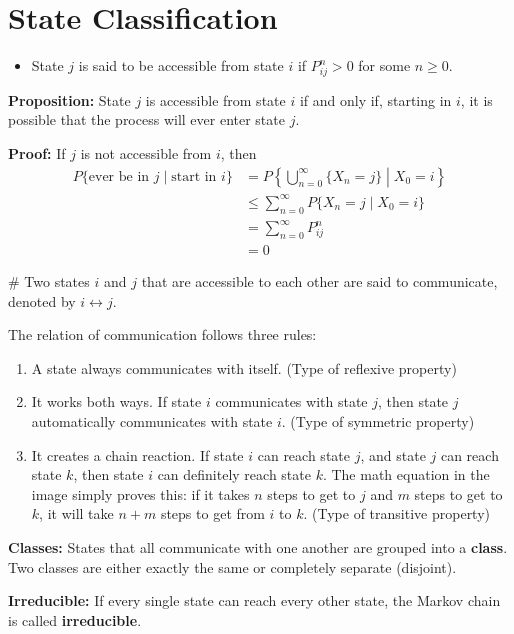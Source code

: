 \section{\textcolor{secondary}{State Classification}}

\begin{itemize}
    \item State $j$ is said to be accessible from state $i$ if $P_{ij}^n > 0$ for some $n \ge 0$.
\end{itemize}

\textbf{Proposition:} State $j$ is accessible from state $i$ if and only if, starting in $i$, it is possible that the process will ever enter state $j$.

\textbf{Proof:} If $j$ is not accessible from $i$, then
\begin{align*}
    P\{\text{ever be in } j \mid \text{start in } i\} &= P\left\{ \bigcup_{n=0}^\infty \{X_n = j\} \middle| X_0 = i \right\} \\
    &\le \sum_{n=0}^\infty P\{X_n = j \mid X_0 = i\} \\
    &= \sum_{n=0}^\infty P_{ij}^n \\
    &= 0
\end{align*}

\# Two states $i$ and $j$ that are accessible to each other are said to communicate, denoted by $i \leftrightarrow j$.

The relation of communication follows three rules:
\begin{enumerate}
    \item A state always communicates with itself. (Type of reflexive property)
    \item It works both ways. If state $i$ communicates with state $j$, then state $j$ automatically communicates with state $i$. (Type of symmetric property)
    \item It creates a chain reaction. If state $i$ can reach state $j$, and state $j$ can reach state $k$, then state $i$ can definitely reach state $k$. The math equation in the image simply proves this: if it takes $n$ steps to get to $j$ and $m$ steps to get to $k$, it will take $n+m$ steps to get from $i$ to $k$. (Type of transitive property)
\end{enumerate}

\textbf{Classes:} States that all communicate with one another are grouped into a \textbf{class}. Two classes are either exactly the same or completely separate (disjoint).

\textbf{Irreducible:} If every single state can reach every other state, the Markov chain is called \textbf{irreducible}.

